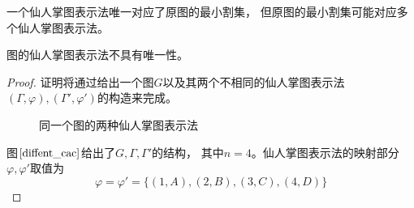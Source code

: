 一个仙人掌图表示法唯一对应了原图的最小割集，
但原图的最小割集可能对应多个仙人掌图表示法。

\begin{lemma}
  \label{cactusnonunique}
  图的仙人掌图表示法不具有唯一性。
\end{lemma}
\begin{proof}
  证明将通过给出一个图$G$以及其两个不相同的仙人掌图表示法$(\Gamma,\varphi),(\Gamma',\varphi')$的构造来完成。
  \begin{figure}[htb]
    \centering
    \hspace{4em}
    \hspace{4em}
    \caption{同一个图的两种仙人掌图表示法}
    \label{diffent_cac}
\end{figure}

图$\ref{diffent_cac}$给出了$G,\Gamma,\Gamma'$的结构，
其中$n=4$。仙人掌图表示法的映射部分$\varphi,\varphi'$取值为
\begin{equation}
  \varphi=\varphi'=\{(1,A),(2,B),(3,C),(4,D)\}
\end{equation}


\end{proof}
